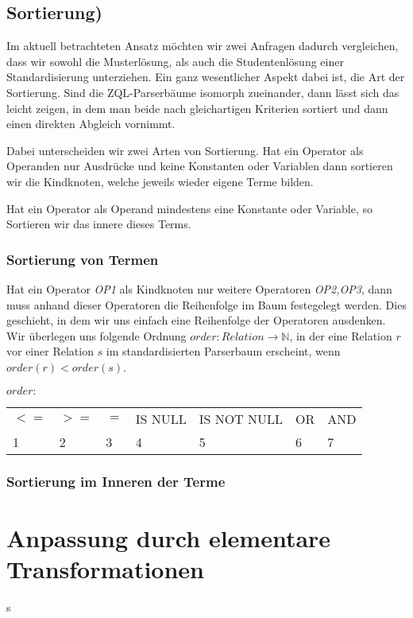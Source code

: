 \subsection{Sortierung)}

Im aktuell betrachteten Ansatz möchten wir zwei Anfragen dadurch vergleichen, dass wir sowohl die Musterlösung, als auch die Studentenlösung einer Standardisierung unterziehen. Ein ganz wesentlicher Aspekt dabei ist, die Art der Sortierung. Sind die ZQL-Parserbäume isomorph zueinander, dann lässt sich das leicht zeigen, in dem man beide nach gleichartigen Kriterien sortiert und dann einen direkten Abgleich vornimmt.

Dabei unterscheiden wir zwei Arten von Sortierung. Hat ein Operator als Operanden nur Ausdrücke und keine Konstanten oder Variablen dann sortieren wir die Kindknoten, welche jeweils wieder eigene Terme bilden.

Hat ein Operator als Operand mindestens eine Konstante oder Variable, so Sortieren wir das innere dieses Terms.

\subsubsection{Sortierung von Termen}

Hat ein Operator \textit{OP1} als Kindknoten nur weitere Operatoren \textit{OP2,OP3}, dann muss anhand dieser Operatoren die Reihenfolge im Baum festegelegt werden. Dies geschieht, in dem wir uns einfach eine Reihenfolge der Operatoren ausdenken. Wir überlegen uns folgende Ordnung $order:\textit{Relation}\to\mathbb{N}$, in der eine Relation $r$ vor einer Relation $s$ im standardisierten Parserbaum erscheint, wenn $order(r) < order(s)$.

$order:$\\

\begin{tabular}{|lllllll|}
\hline
$<=$ & $>=$ & $=$ & IS NULL & IS NOT NULL & OR & AND \\
1 & 2 & 3 & 4 & 5 & 6 & 7 \\
\hline
\end{tabular}

\subsubsection{Sortierung im Inneren der Terme}


\section{Anpassung durch elementare Transformationen}

s

